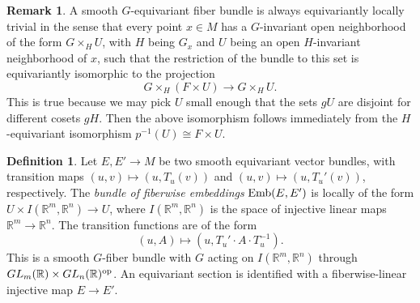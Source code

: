 \documentclass[11pt]{amsart}
\theoremstyle{definition}
\newtheorem{defn}{Definition}[section]
\newtheorem{rem}{Remark}[section]
\numberwithin{equation}{section}
\numberwithin{figure}{section}
\newcommand{\R}{\mathbb R}
\newcommand{\Emb}{\textup{Emb}}
\newcommand{\op}{\textup{op}}
\newcommand{\ourdefn}[1]{{\it #1}}
\begin{document}

\begin{rem}
	A smooth $G$-equivariant fiber bundle is always equivariantly locally trivial in the sense that every point $x\in M$ has a $G$-invariant open neighborhood of the form $G \times_H U$, with $H$ being $G_x$ and $U$ being an open $H$-invariant neighborhood of $x$, such that the restriction of the bundle to this set is equivariantly isomorphic to the projection 
$$
G\times_H (F\times U)\to G\times_H U.
$$
	This is true because we may pick $U$ small enough that the sets $gU$ are disjoint for different cosets $gH$. Then the above isomorphism follows immediately from the $H$-equivariant isomorphism $p^{-1}(U) \cong F \times U$.
\end{rem}



\begin{defn}\label{associated_bundles}
	Let $E,E' \to M$ be two smooth equivariant vector bundles, with transition maps $(u,v) \mapsto (u,T_u(v))$ and $(u,v) \mapsto (u,T_u'(v))$, respectively. The \ourdefn{bundle of fiberwise embeddings} $\Emb(E,E')$ is locally of the form $U \times I(\R^m,\R^n) \to U$, where $I(\R^m,\R^n)$ is the space of injective linear maps $\R^m \to \R^n$. The transition functions are of the form
	\[ (u,A) \mapsto (u,T_u' \cdot A \cdot T_u^{-1}). \]
	This is a smooth $G$-fiber bundle with $G$ acting on $I(\R^m,\R^n)$ through $GL_m(\R) \times GL_n(\R)^\op$. An equivariant section is identified with a fiberwise-linear injective map $E \to E'$.
\end{defn}
\end{document}
